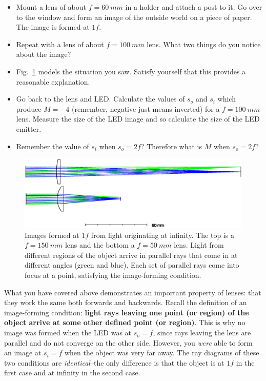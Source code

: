 \documentclass[a4paper]{report}
\begin{document}
\begin{itemize}
\item Mount a lens of about $f=60~mm$ in a holder and attach a post to it. 
Go over to the window and form an image of the outside world on a piece of paper. 
The image is formed at $1f$.
\item Repeat with a lens of about $f=100~mm$ lens. 
What two things do you notice about the image? 
\item Fig.~\ref{fig:outside} models the situation you saw. Satisfy yourself that this provides a reasonable explanation. 
\item Go back to the lens and LED.
Calculate the values of $s_o$ and $s_i$ which produce $M=-4$ (remember, negative just means inverted) for a $f=100~mm$ lens. 
Measure the size of the LED image and so calculate the size of the LED emitter. 
\item Remember the value of $s_i$ when $s_o=2f$? Therefore what is $M$ when $s_o=2f$?
\end{itemize}


\begin{figure}[h]
\center
\includegraphics[width=6in]{lens_f_comparison.eps}
\caption{Images formed at $1f$ from light originating at infinity. 
The top is a $f=150~mm$ lens and the bottom a $f=50~mm$ lens.
Light from different regions of the object arrive in parallel rays that come in at different angles (green and blue). 
Each set of parallel rays come into focus at a point, satisfying the image-forming condition. }
\label{fig:outside}
\end{figure}


What you have covered above demonstrates an important property of lenses: that they work the same both forwards and backwards.
Recall the definition of an image-forming condition: \textbf{light rays leaving one point (or region) of the object arrive at some other defined point (or region)}.
This is why no image was formed when the LED was at $s_o=f$, since rays leaving the lens are parallel and do not converge on the other side. 
However, you \textit{were} able to form an image at $s_i=f$ when the object was very far away. 
The ray diagrams of these two conditions are \textit{identical}--the only difference is that the object is at $1f$ in the first case and at infinity in the second case.
\end{document}
